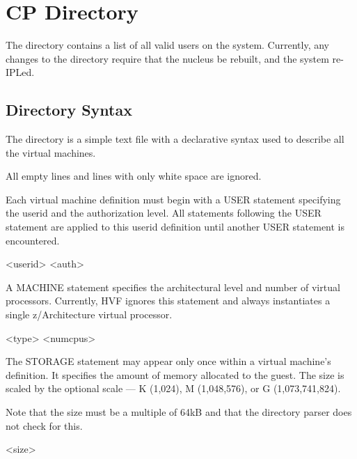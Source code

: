 \chapter{CP Directory}
\label{chap:directory}
The directory contains a list of all valid users on the system.  Currently,
any changes to the directory require that the nucleus be rebuilt, and the
system re-IPLed.

\section{Directory Syntax}
The directory is a simple text file with a declarative syntax used to
describe all the virtual machines.

All empty lines and lines with only white space are ignored.

\cbstart
Each virtual machine definition must begin with a USER statement specifying
the userid and the authorization level.  All statements following the USER
statement are applied to this userid definition until another USER statement
is encountered.

\begin{syntdiag}
 <userid> <auth>
\end{syntdiag}
\cbend

A \cbstart MACHINE \cbend statement specifies the architectural level and
number of virtual processors.  Currently, HVF ignores this statement and
always instantiates a single z/Architecture virtual processor.

\cbstart
\begin{syntdiag}
 <type> <numcpus>
\end{syntdiag}
\cbend

The STORAGE statement may appear only once within a virtual machine's
definition.  It specifies the amount of memory allocated to the guest.  The
size is scaled by the optional scale --- K (\mbox{1,024}), M
(\mbox{1,048,576}), or G (\mbox{1,073,741,824}).

Note that the size must be a multiple of 64kB and that the directory parser
does not check for this.

\begin{syntdiag}
 <size>
\begin{stack}
	\\
	 \\
	 \\
\end{stack}
\end{syntdiag}

